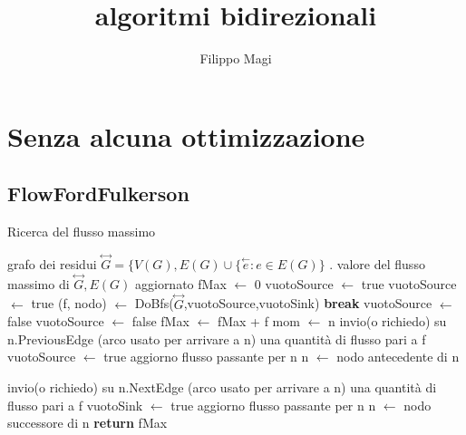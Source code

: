 \documentclass{article}
\title{algoritmi bidirezionali}
\author{Filippo Magi }
\begin{document}
\maketitle
\section{Senza alcuna ottimizzazione}
\subsection{FlowFordFulkerson}
\begin{algorithm}
\caption{Ricerca del flusso massimo}
\begin{algorithmic}[1]
\REQUIRE grafo dei residui $\overset{\leftrightarrow}{G} = \{V(G),E(G) \cup \{ \overset{\leftarrow}{e} : e \in E(G) \}$ .
\ENSURE valore del flusso massimo di $\overset{\leftrightarrow}{G}, E(G) $ aggiornato
\STATE fMax $\leftarrow$ 0
\STATE vuotoSource $\leftarrow$ true
\STATE vuotoSource $\leftarrow$ true
\LOOP
\STATE (f, nodo) $\leftarrow$ DoBfs($\overset{\leftrightarrow}{G}$,vuotoSource,vuotoSink)
\STATE \textbf{break}
\ENDIF
\STATE vuotoSource $\leftarrow$ false
\STATE vuotoSource $\leftarrow$ false
\STATE fMax $\leftarrow$ fMax + f
\STATE mom $\leftarrow$ n
\STATE invio(o richiedo) su n.PreviousEdge (arco usato per arrivare a n) una quantità di flusso pari a f 
\STATE vuotoSource $\leftarrow$ true
\ENDIF
\STATE aggiorno flusso passante per n 
\STATE n $\leftarrow$ nodo antecedente di n
\ENDWHILE
{}

\STATE invio(o richiedo) su n.NextEdge (arco usato per arrivare a n) una quantità di flusso pari a f 
\STATE vuotoSink $\leftarrow$ true
\ENDIF
\STATE aggiorno flusso passante per n 
\STATE n $\leftarrow$ nodo successore di n
\ENDWHILE
\ENDLOOP
\STATE \textbf{return} fMax
\end{algorithmic}
\end{algorithm}
\end{document}
